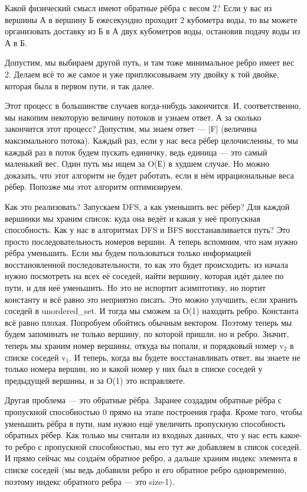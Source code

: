 \documentclass[12pt]{article}
\begin{document}
Какой физический смысл имеют обратные рёбра с весом 2? Если у вас из вершины А в вершину Б ежесекундно проходит 2 кубометра воды, то вы можете организовать доставку из Б в А двух кубометров воды, остановив подачу воды из А в Б.

Допустим, мы выбираем другой путь, и там тоже минимальное ребро имеет вес 2. Делаем всё то же самое и уже приплюсовываем эту двойку к той двойке, которая была в первом пути, и так далее.

Этот процесс в большинстве случаев когда-нибудь закончится. И, соответственно, мы накопим некоторую величину потоков и узнаем ответ. А за сколько закончится этот процесс? Допустим, мы знаем ответ --- |F| (величина максимального потока). Каждый раз, если у нас веса рёбер целочисленны, то мы каждый раз в поток будем пускать единичку, ведь единица --- это самый маленький вес. Один путь мы ищем за O(Е) в худшем случае. Но можно доказать, что этот алгоритм не будет работать, если в нём иррациональные веса рёбер. Попозже мы этот алгоритм оптимизируем.

Как это реализовать? Запускаем DFS, а как уменьшить вес рёбер? Для каждой вершинки мы храним список: куда она ведёт и какая у неё пропускная способность. Как у нас в алгоритмах DFS и BFS восстанавливается путь? Это просто последовательность номеров вершин. А теперь вспомним, что нам нужно рёбра уменьшить. Если мы будем пользоваться только информацией восстановленной последовательности, то как это будет происходить: из начала нужно посмотреть на всех её соседей, найти вершину, которая идёт далее по пути, и для неё уменьшить. Но это не испортит асимптотику, но портит константу и всё равно это неприятно писать. Это можно улучшить, если хранить соседей в unordered\_set. И тогда мы сможем за О(1) находить ребро. Константа всё равно плохая. Попробуем обойтись обычным вектором. Поэтому теперь мы будем запоминать не только вершину, по которой пришли, но и ребро. Значит, теперь мы храним номер вершины, откуда вы попали, и порядковый номер v$_2$ в списке соседей v$_1$. И теперь, когда вы будете восстанавливать ответ, вы знаете не только номера вершин, но и какой номер у них был в списке соседей у предыдущей вершины, и за О(1) это исправляете.

Другая проблема --- это обратные рёбра. Заранее создадим обратные рёбра с пропускной способностью 0 прямо на этапе построения графа. Кроме того, чтобы уменьшить рёбра в пути, нам нужно ещё увеличить пропускную способность обратных рёбер. Как только мы считали из входных данных, что у нас есть какое-то ребро с пропускной способностью, мы его тут же добавляем в список соседей. И прямо сейчас мы создаём обратное ребро, а дальше храним индекс элемента в списке соседей (мы ведь добавили ребро и его обратное ребро одновременно, поэтому индекс обратного ребра --- это size-1).
\end{document}
